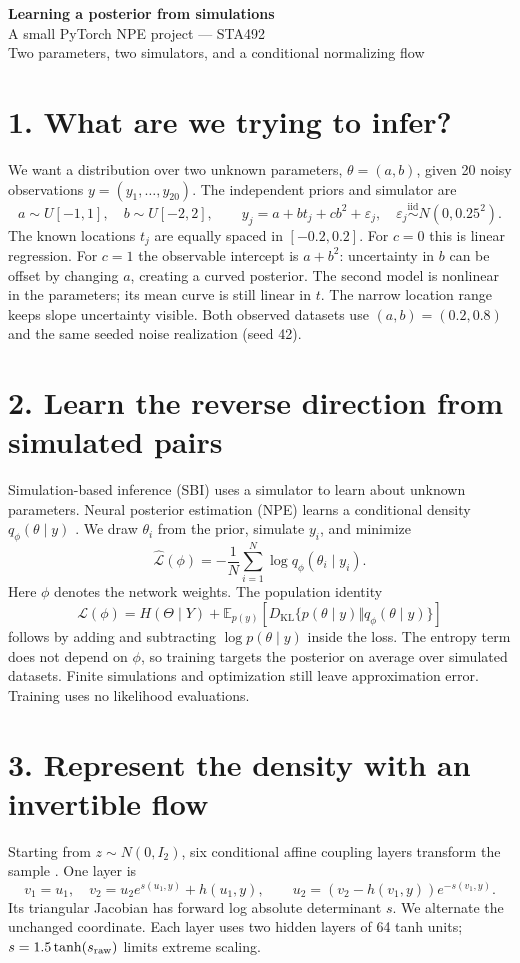 \documentclass[11pt,a4paper]{article}
\newcommand{\E}{\mathbb E}
\newcommand{\KL}{D_{\mathrm{KL}}}
\begin{document}
\begin{center}
  {\LARGE\bfseries Learning a posterior from simulations}\\[5pt]
  {\large A small PyTorch NPE project --- STA492}\\[3pt]
  {\small Two parameters, two simulators, and a conditional normalizing flow}
\end{center}

\section*{1. What are we trying to infer?}
We want a distribution over two unknown parameters, $\theta=(a,b)$, given
20 noisy observations $y=(y_1,\ldots,y_{20})$. The independent priors and
simulator are
\[
 a\sim U[-1,1],\quad b\sim U[-2,2],\qquad
 y_j=a+bt_j+cb^2+\varepsilon_j,\quad
 \varepsilon_j\overset{\mathrm{iid}}\sim N(0,0.25^2).
\]
The known locations $t_j$ are equally spaced in $[-0.2,0.2]$.
For $c=0$ this is linear regression. For $c=1$ the observable intercept is
$a+b^2$: uncertainty in $b$ can be offset by changing $a$, creating a curved
posterior. The second model is nonlinear in the parameters; its mean curve
is still linear in $t$. The narrow location range keeps slope uncertainty
visible. Both observed datasets use $(a,b)=(0.2,0.8)$ and the same seeded
noise realization (seed 42).

\section*{2. Learn the reverse direction from simulated pairs}
Simulation-based inference (SBI) uses a simulator to learn about unknown
parameters. Neural posterior estimation (NPE) learns a conditional density
$q_\phi(\theta\mid y)$ \cite{npe}. We draw $\theta_i$ from the prior, simulate
$y_i$, and minimize
\[
 \widehat{\mathcal L}(\phi)
 =-\frac1N\sum_{i=1}^N\log q_\phi(\theta_i\mid y_i).
\]
Here $\phi$ denotes the network weights. The population identity
\[
 \mathcal L(\phi)=H(\Theta\mid Y)
 +\E_{p(y)}\!\left[\KL\{p(\theta\mid y)\Vert q_\phi(\theta\mid y)\}\right]
\]
follows by adding and subtracting $\log p(\theta\mid y)$ inside the loss.
The entropy term does not depend on $\phi$, so training targets the posterior
on average over simulated datasets. Finite simulations and optimization
still leave approximation error. Training uses no likelihood evaluations.

\section*{3. Represent the density with an invertible flow}
Starting from $z\sim N(0,I_2)$, six conditional affine coupling layers
transform the sample \cite{realnvp}. One layer is
\[
 v_1=u_1,\quad v_2=u_2e^{s(u_1,y)}+h(u_1,y),\qquad
 u_2=(v_2-h(v_1,y))e^{-s(v_1,y)}.
\]
Its triangular Jacobian has forward log absolute determinant $s$.
We alternate the unchanged coordinate. Each layer uses two hidden layers
of 64 tanh units; $s=1.5\tanh(s_{\rm raw})$ limits extreme scaling.
\end{document}

